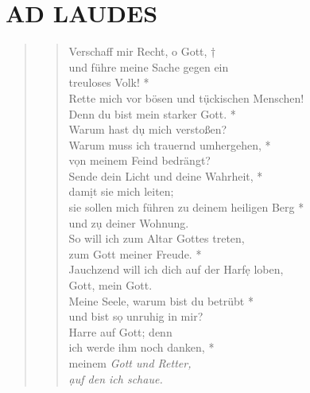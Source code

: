 \begin{flushleft}


\end{flushleft}


\section[LAUDES]{AD LAUDES}

\def\greinitialformat#1{{\fontsize{40}{40}\selectfont #1}}
\gresetfirstlineaboveinitial{\small \textcolor{red}{ Ps 43}}{}
\setaboveinitialseparation{0.72mm}


\vspace{0.6cm}

\begin{quote}
\begin{verse}
Verschaff mir Recht, o Gott, †\\
und führe meine Sache gegen ein \\
treuloses Volk! *\\  
Rette mich vor bösen und t\d ückischen Menschen!\\ 
\vin Denn du bist mein starker Gott. *\\ 
\vin Warum hast d\d u mich verstoßen? \\
Warum muss ich trauernd umhergehen, *\\  
v\d on meinem Feind bedrängt?\\ 
\vin Sende dein Licht und deine Wahrheit, *\\ 
\vin dam\d it sie mich leiten; \\
sie sollen mich führen zu deinem heiligen Berg *\\  
und z\d u deiner Wohnung. \\ 
\vin So will ich zum Altar Gottes treten,\\ 
\vin zum Gott meiner Freude. *\\ 
\vin Jauchzend will ich dich auf der Harf\d e loben,\\ 
\vin Gott, mein Gott. \\
Meine Seele, warum bist du betrübt *\\ 
und bist s\d o unruhig in mir? \\ 
\vin Harre auf Gott; denn\\ 
\vin ich werde ihm noch danken, *\\ 
\vin  meinem \textit{Gott und Retter,\\ 
\vin \d auf den ich schaue.}\\

\end{verse}
\end{quote}


